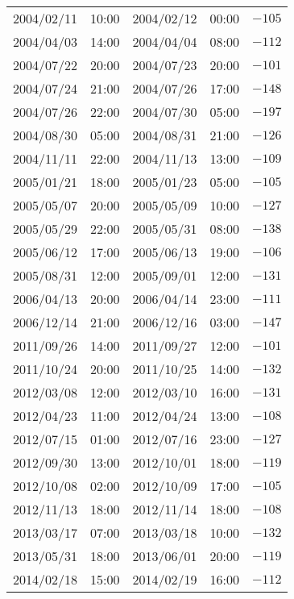 \begin{table}[h]
\begin{tabular}{ccccc}
	2004/02/11 & 10:00 & 2004/02/12 & 00:00 & $ -105 $ \\
	2004/04/03 & 14:00 & 2004/04/04 & 08:00 & $ -112 $ \\
	2004/07/22 & 20:00 & 2004/07/23 & 20:00 & $ -101 $ \\
	2004/07/24 & 21:00 & 2004/07/26 & 17:00 & $ -148 $ \\
	2004/07/26 & 22:00 & 2004/07/30 & 05:00 & $ -197 $ \\
	2004/08/30 & 05:00 & 2004/08/31 & 21:00 & $ -126 $ \\
	2004/11/11 & 22:00 & 2004/11/13 & 13:00 & $ -109 $ \\
	2005/01/21 & 18:00 & 2005/01/23 & 05:00 & $ -105 $ \\
	2005/05/07 & 20:00 & 2005/05/09 & 10:00 & $ -127 $ \\
	2005/05/29 & 22:00 & 2005/05/31 & 08:00 & $ -138 $ \\
	2005/06/12 & 17:00 & 2005/06/13 & 19:00 & $ -106 $ \\
	2005/08/31 & 12:00 & 2005/09/01 & 12:00 & $ -131 $ \\
	2006/04/13 & 20:00 & 2006/04/14 & 23:00 & $ -111 $ \\
	2006/12/14 & 21:00 & 2006/12/16 & 03:00 & $ -147 $ \\ 
	2011/09/26 & 14:00 & 2011/09/27 & 12:00 & $ -101 $ \\
	2011/10/24 & 20:00 & 2011/10/25 & 14:00 & $ -132 $ \\
	2012/03/08 & 12:00 & 2012/03/10 & 16:00 & $ -131 $ \\
	2012/04/23 & 11:00 & 2012/04/24 & 13:00 & $ -108 $ \\
	2012/07/15 & 01:00 & 2012/07/16 & 23:00 & $ -127 $ \\
	2012/09/30 & 13:00 & 2012/10/01 & 18:00 & $ -119 $ \\
	2012/10/08 & 02:00 & 2012/10/09 & 17:00 & $ -105 $ \\
	2012/11/13 & 18:00 & 2012/11/14 & 18:00 & $ -108 $ \\
	2013/03/17 & 07:00 & 2013/03/18 & 10:00 & $ -132 $ \\
	2013/05/31 & 18:00 & 2013/06/01 & 20:00 & $ -119 $ \\
	2014/02/18 & 15:00 & 2014/02/19 & 16:00 & $ -112 $ \\ \hline
	\end{tabular}%
	\end{table}

	


%
%